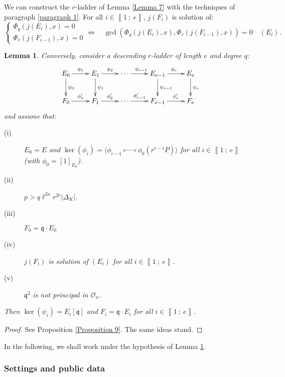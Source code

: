 \documentclass[a4paper,10pt]{report}
\theoremstyle{definition}
\theoremstyle{plain}
\newtheorem{Lemma}[Definition]{Lemma}
\theoremstyle{definition}
\newcommand{\mO}{\mathcal{O}}
\renewcommand{\i}[2]{\left\llbracket #1~;~#2\right\rrbracket}
\renewcommand{\(}{\left(}
\renewcommand{\)}{\right)}
\newcommand{\mf}[1]{\mathfrak{#1}}
\begin{document}
We can construct the $r$-ladder of Lemma \ref{Lemma 7} with the techniques of paragraph \ref{paragraph 1}. For all $i\in\i{1}{e}$, $j(F_i)$ is solution of:
\[\left\{\begin{array}{c}
\Phi_q(j(E_i),x)=0\\
\Phi_r(j(F_{i-1}),x)=0
\end{array}\right. \Longleftrightarrow \quad \gcd(\Phi_q(j(E_i),x),\Phi_r(j(F_{i-1}),x))=0\quad (E_i).\]

\begin{Lemma}\label{Lemma 6}
Conversely, consider a descending $r$-ladder of length $e$ and degree $q$:
\[\xymatrix{
E_0 \ar[d]^{\psi_0} \ar[r]^{\phi_1} & E_1\ar[d]^{\psi_1} \ar[r]^{\phi_{2}}& \cdots \ar[r]^{\phi_{e-1}} & E_{e-1} \ar[d]^{\psi_{e-1}} \ar[r]^{\phi_{e}} & E_e \ar[d]^{\psi_e}\\
F_0 \ar[r]^-{\phi'_1} & F_1 \ar[r]^-{\phi'_{2}}& \cdots \ar[r]^-{\phi'_{e-1}} & F_{e-1} \ar[r]^-{\phi'_{e}} & F_e
}\]
and assume that:
\begin{description}
\item[(i)] $E_0=E$ and $\ker(\phi_i)=\langle\phi_{i-1}\circ \cdots\circ\phi_0(r^{e-i}P)\rangle$ for all $i\in\i{1}{e}$ (with $\phi_0=[1]_{E_0}$).
\item[(ii)] $p>q\ell^{2n}r^{2e}|\Delta_K|$.
\item[(iii)] $F_0=\mf{q}\cdot E_0$
\item[(iv)] $j(F_i)$ is solution of $(E_i)$ for all $i\in\i{1}{e}$.
\item[(v)] $\mf{q}^2$ is not principal in $\mO_n$. 
\end{description}
Then $\ker(\psi_i)=E_i[\mf{q}]$ and $F_i=\mf{q}\cdot E_i$ for all $i\in\i{1}{e}$.
\end{Lemma}

\begin{proof}
See Proposition \ref{Proposition 9}. The same ideas stand.
\end{proof}

In the following, we shall work under the hypothesis of Lemma \ref{Lemma 6}.

\subsubsection{Settings and public data}
\end{document}
